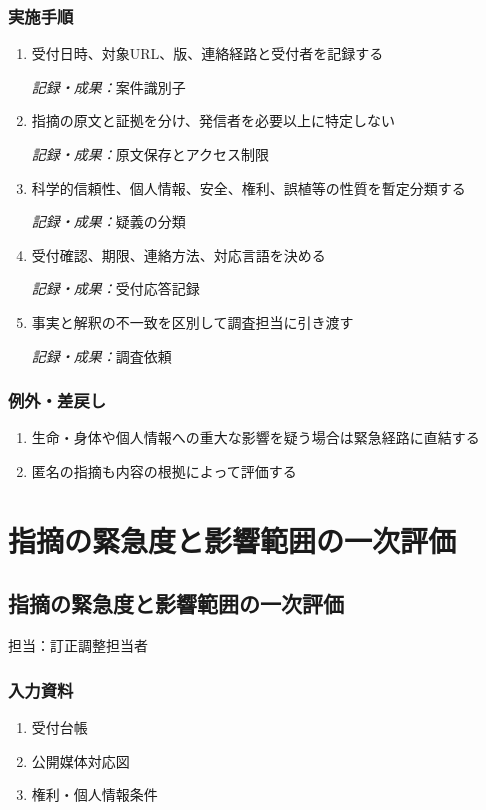 \documentclass[a4paper,11pt]{article}
\begin{document}
\subsubsection*{実施手順}
\begin{enumerate}[leftmargin=2em,itemsep=0.65em]
\item 受付日時、対象URL、版、連絡経路と受付者を記録する\par\noindent\textit{記録・成果：}案件識別子\nobreak\smallskip
\item 指摘の原文と証拠を分け、発信者を必要以上に特定しない\par\noindent\textit{記録・成果：}原文保存とアクセス制限\nobreak\smallskip
\item 科学的信頼性、個人情報、安全、権利、誤植等の性質を暫定分類する\par\noindent\textit{記録・成果：}疑義の分類\nobreak\smallskip
\item 受付確認、期限、連絡方法、対応言語を決める\par\noindent\textit{記録・成果：}受付応答記録\nobreak\smallskip
\item 事実と解釈の不一致を区別して調査担当に引き渡す\par\noindent\textit{記録・成果：}調査依頼\nobreak\smallskip
\end{enumerate}
\subsubsection*{例外・差戻し}
\begin{enumerate}[leftmargin=2em,itemsep=0.35em]
\item 生命・身体や個人情報への重大な影響を疑う場合は緊急経路に直結する
\item 匿名の指摘も内容の根拠によって評価する
\end{enumerate}
\section{指摘の緊急度と影響範囲の一次評価}
\subsection{指摘の緊急度と影響範囲の一次評価}
\par 担当：訂正調整担当者\par\medskip
\subsubsection*{入力資料}
\begin{enumerate}[leftmargin=2em,itemsep=0.35em]
\item 受付台帳
\item 公開媒体対応図
\item 権利・個人情報条件
\end{enumerate}
\end{document}
